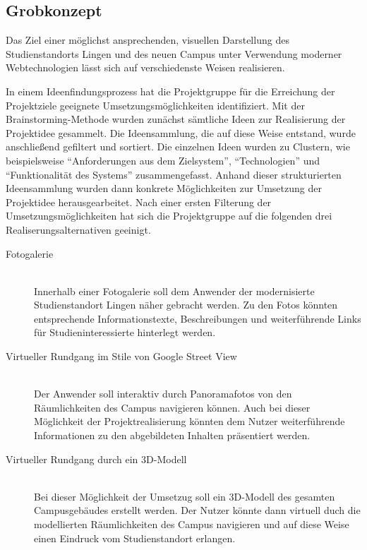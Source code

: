 \subsection{Grobkonzept}
\label{sec:Grobkonzept}

Das Ziel einer möglichst ansprechenden, visuellen Darstellung des
Studienstandorts Lingen und des neuen Campus unter Verwendung moderner
Webtechnologien lässt sich auf verschiedenste Weisen realisieren. 

In einem Ideenfindungsprozess hat die Projektgruppe für die Erreichung der
Projektziele geeignete Umsetzungsmöglichkeiten identifiziert. Mit der
Brainstorming-Methode wurden zunächst sämtliche Ideen zur Realisierung der
Projektidee gesammelt. Die Ideensammlung, die auf diese Weise entstand, wurde
anschließend gefiltert und sortiert. Die einzelnen Ideen wurden zu Clustern, wie
beispielsweise "`Anforderungen aus dem Zielsystem"', "`Technologien"' und
"`Funktionalität des Systems"' zusammengefasst. Anhand dieser strukturierten
Ideensammlung wurden dann konkrete Möglichkeiten zur Umsetzung der Projektidee
herausgearbeitet. Nach einer ersten Filterung der Umsetzungsmöglichkeiten hat
sich die Projektgruppe auf die folgenden drei Realiserungsalternativen geeinigt. 


\begin{description}
\item[Fotogalerie] \hfill \\
Innerhalb einer Fotogalerie soll dem Anwender der modernisierte Studienstandort
Lingen näher gebracht werden. Zu den Fotos könnten entsprechende
Informationstexte, Beschreibungen und weiterführende Links für
Studieninteressierte hinterlegt werden.
\item[Virtueller Rundgang im Stile von Google Street View] \hfill \\
Der Anwender soll interaktiv durch Panoramafotos von den Räumlichkeiten des
Campus navigieren können. Auch bei dieser Möglichkeit der Projektrealisierung
könnten dem Nutzer weiterführende Informationen zu den abgebildeten Inhalten
präsentiert werden.
\item[Virtueller Rundgang durch ein 3D-Modell] \hfill \\
Bei dieser Möglichkeit der Umsetzug soll ein 3D-Modell des gesamten
Campusgebäudes erstellt werden. Der Nutzer könnte dann virtuell duch die
modellierten Räumlichkeiten des Campus navigieren und auf diese Weise einen
Eindruck vom Studienstandort erlangen.
\end{description}

